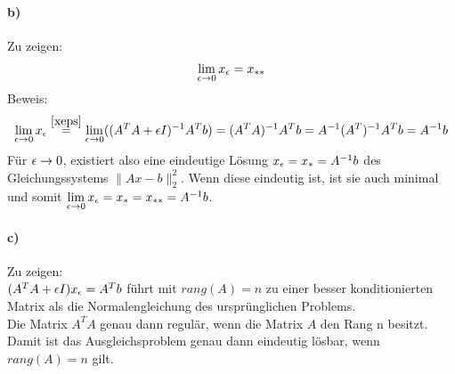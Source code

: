\paragraph*{b)}
Zu zeigen:
\begin{align*}\lim\limits_{\epsilon \rightarrow 0}{x_\epsilon} = x_{**}\end{align*}
Beweis:
\begin{align}
\lim\limits_{\epsilon \rightarrow 0}{x_\epsilon}\overset{\eqref{xeps}}{=}\lim\limits_{\epsilon \rightarrow 0}((A^TA + \epsilon I)^{-1}A^Tb)=(A^TA)^{-1}A^Tb=A^{-1}(A^{T})^{-1}A^Tb=A^{-1}b
\end{align}
Für $\epsilon\rightarrow 0$, existiert also eine eindeutige Lösung $x_\epsilon=x_*=A^{-1}b$ des Gleichungssystems $\|Ax-b\|_2^{2}$. Wenn diese eindeutig ist, ist sie auch minimal und somit $\lim\limits_{\epsilon \rightarrow 0}{x_\epsilon}=x_*=x_{**}=A^{-1}b$.


\paragraph*{c)}
Zu zeigen:\\
$(A^TA + \epsilon I)x_\epsilon = A^Tb$ führt mit $rang(A) = n$ zu einer besser konditionierten Matrix als die Normalengleichung des ursprünglichen Problems.\\
\newline
Die Matrix $A^TA$ genau dann regulär, wenn die Matrix $A$ den Rang n besitzt. Damit ist das Ausgleichsproblem genau dann eindeutig lösbar, wenn $rang(A) =n$ gilt.
